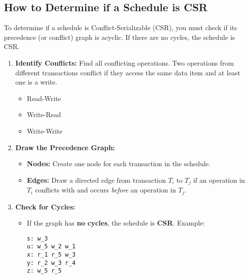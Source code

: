 \subsection*{How to Determine if a Schedule is CSR}
To determine if a schedule is Conflict-Serializable (CSR), you must check if its precedence (or conflict) graph is acyclic. If there are no cycles, the schedule is CSR.

\begin{enumerate}
    \item \textbf{Identify Conflicts:} Find all conflicting operations. Two operations from different transactions conflict if they access the same data item and at least one is a write.
          \begin{itemize}
              \item Read-Write
              \item Write-Read
              \item Write-Write
          \end{itemize}
    \item \textbf{Draw the Precedence Graph:}
          \begin{itemize}
              \item \textbf{Nodes:} Create one node for each transaction in the schedule.
              \item \textbf{Edges:} Draw a directed edge from transaction \textbf{$T_i$} to \textbf{$T_j$} if an operation in $T_i$ conflicts with and occurs \textit{before} an operation in $T_j$.
          \end{itemize}
    \item \textbf{Check for Cycles:}
          \begin{itemize}
              \item If the graph has \textbf{no cycles}, the schedule is \textbf{CSR}. Example:

                    \begin{verbatim}
s: w_3
u: w_5 w_2 w_1
x: r_1 r_5 w_3
y: r_2 w_3 r_4
z: w_5 r_5
\end{verbatim}


                    \begin{tikzpicture}[
                            node_style/.style={
                                    circle,
                                    draw=black,
                                    fill=cyan!30,
                                    minimum size=1cm,
                                    font=\Large
                                },
                            arrow_style/.style={
                                    -Stealth,
                                    very thick
                                },
                            gray_arrow_style/.style={
                                    -Stealth,
                                    thick,
                                    gray
                                }
                        ]


\end{tikzpicture}
\end{itemize}
\end{enumerate}
